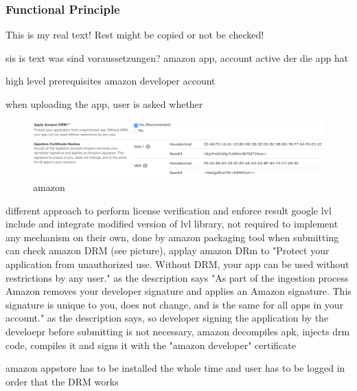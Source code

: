 \subsubsection{Functional Principle}\label{subsection:license-amazon-functional}
This is my real text! Rest might be copied or not be checked!

sis is text
was sind voraussetzungen? amazon app, account active der die app hat\newline

high level prerequisites
amazon developer account

when uploading the app, user is asked whether
\begin{figure}[h]
    \centering
    \includegraphics[width=1\textwidth]{data/amazon.png}
    \caption{amazon}
    \label{fig:amazon}
\end{figure}

%
different approach to perform license verification and enforce result
google lvl include and integrate modified version of lvl library, not required to implement any mechanism on their own, done by amazon packaging tool
when submitting can check amazon DRM (see picture), applay amazon DRm to "Protect your application from unauthorized use. Without DRM, your app can be used without restrictions by any user." as the description says
"As part of the ingestion process Amazon removes your developer signature and applies an Amazon signature. This signature is unique to you, does not change, and is the same for all apps in your account."  as the description says, so developer signing the application by the develoepr before submitting is not necessary, amazon decompiles apk, injects drm code, compiles it and signs it with the "amazon developer" certificate
\cite{munteanLicense}
%

amazon appstore has to be installed the whole time and user has to be logged in order that the DRM works
